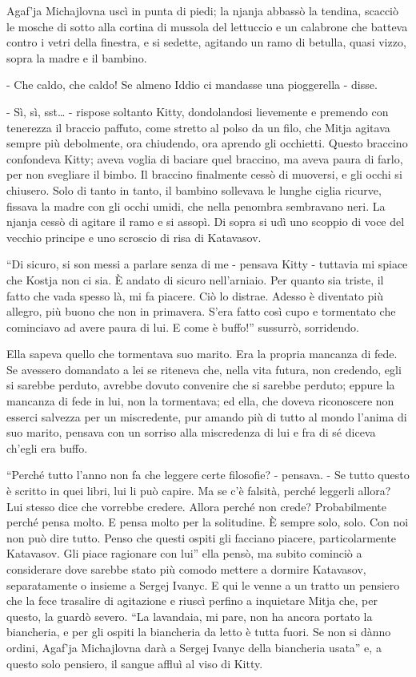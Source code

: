 Agaf'ja Michajlovna uscì in punta di piedi; la njanja abbassò la tendina, scacciò le mosche di sotto alla cortina di mussola del lettuccio e un calabrone che batteva contro i vetri della finestra, e si sedette, agitando un ramo di betulla, quasi vizzo, sopra la madre e il bambino. 

- Che caldo, che caldo! Se almeno Iddio ci mandasse una pioggerella - disse. 

- Sì, sì, sst\ldots{} - rispose soltanto Kitty, dondolandosi lievemente e premendo con tenerezza il braccio paffuto, come stretto al polso da un filo, che Mitja agitava sempre più debolmente, ora chiudendo, ora aprendo gli occhietti. Questo braccino confondeva Kitty; aveva voglia di baciare quel braccino, ma aveva paura di farlo, per non svegliare il bimbo. Il braccino finalmente cessò di muoversi, e gli occhi si chiusero. Solo di tanto in tanto, il bambino sollevava le lunghe ciglia ricurve, fissava la madre con gli occhi umidi, che nella penombra sembravano neri. La njanja cessò di agitare il ramo e si assopì. Di sopra si udì uno scoppio di voce del vecchio principe e uno scroscio di risa di Katavasov. 

``Di sicuro, si son messi a parlare senza di me - pensava Kitty - tuttavia mi spiace che Kostja non ci sia. È andato di sicuro nell'arniaio. Per quanto sia triste, il fatto che vada spesso là, mi fa piacere. Ciò lo distrae. Adesso è diventato più allegro, più buono che non in primavera. S'era fatto così cupo e tormentato che cominciavo ad avere paura di lui. E come è buffo!'' sussurrò, sorridendo. 

Ella sapeva quello che tormentava suo marito. Era la propria mancanza di fede. Se avessero domandato a lei se riteneva che, nella vita futura, non credendo, egli si sarebbe perduto, avrebbe dovuto convenire che si sarebbe perduto; eppure la mancanza di fede in lui, non la tormentava; ed ella, che doveva riconoscere non esserci salvezza per un miscredente, pur amando più di tutto al mondo l'anima di suo marito, pensava con un sorriso alla miscredenza di lui e fra di sé diceva ch'egli era buffo. 

``Perché tutto l'anno non fa che leggere certe filosofie? - pensava. - Se tutto questo è scritto in quei libri, lui li può capire. Ma se c'è falsità, perché leggerli allora? Lui stesso dice che vorrebbe credere. Allora perché non crede? Probabilmente perché pensa molto. E pensa molto per la solitudine. È sempre solo, solo. Con noi non può dire tutto. Penso che questi ospiti gli facciano piacere, particolarmente Katavasov. Gli piace ragionare con lui'' ella pensò, ma subito cominciò a considerare dove sarebbe stato più comodo mettere a dormire Katavasov, separatamente o insieme a Sergej Ivanyc. E qui le venne a un tratto un pensiero che la fece trasalire di agitazione e riuscì perfino a inquietare Mitja che, per questo, la guardò severo. ``La lavandaia, mi pare, non ha ancora portato la biancheria, e per gli ospiti la biancheria da letto è tutta fuori. Se non si dànno ordini, Agaf'ja Michajlovna darà a Sergej Ivanyc della biancheria usata'' e, a questo solo pensiero, il sangue affluì al viso di Kitty. 

